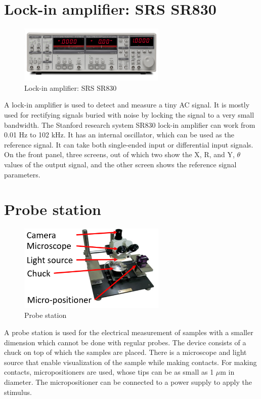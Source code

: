 \documentclass[12pt,a4paper,bold]{thesis}
\theoremstyle{thm}
\theoremstyle{definition}
\begin{document}
\section{Lock-in amplifier: SRS SR830}
\begin{figure}[H]
	\centering
   \includegraphics[width=7cm]{Images/73.jpg} 
   \caption{Lock-in amplifier: SRS SR830}
\end{figure}
\indent\indent\indent A lock-in amplifier is used to detect and measure a tiny AC signal. It is mostly used for rectifying signals buried with noise by locking the signal to a very small bandwidth. The Stanford research system SR830 lock-in amplifier can work from 0.01 Hz to 102 kHz. It has an internal oscillator, which can be used as the reference signal. It can take both single-ended input or differential input signals. On the front panel, three screens, out of which two show the X, R, and Y, $\theta$ values of the output signal, and the other screen shows the reference signal parameters.
\section{Probe station}
\begin{figure}[H]
	\centering
   \includegraphics[width=7cm]{Images/16.png} 
   \caption{Probe station}
\end{figure}
\indent\indent\indent A probe station is used for the electrical measurement of samples with a smaller dimension which cannot be done with regular probes. The device consists of a chuck on top of which the samples are placed. There is a microscope and light source that enable visualization of the sample while making contacts. For making contacts, micropositioners are used, whose tips can be as small as 1 $\mu$m in diameter. The micropositioner can be connected to a power supply to apply the stimulus.  
\end{document}
